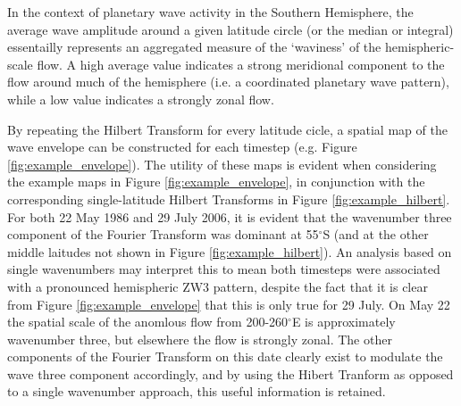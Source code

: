 In the context of planetary wave activity in the Southern Hemisphere, the average wave amplitude around a given latitude circle (or the median or integral) essentailly represents an aggregated measure of the `waviness' of the hemispheric-scale flow. A high average value indicates a strong meridional component to the flow around much of the hemisphere (i.e. a coordinated planetary wave pattern), while a low value indicates a strongly zonal flow. 

By repeating the Hilbert Transform for every latitude cicle, a spatial map of the wave envelope can be constructed for each timestep (e.g. Figure \ref{fig:example_envelope}). The utility of these maps is evident when considering the example maps in Figure \ref{fig:example_envelope}, in conjunction with the corresponding single-latitude Hilbert Transforms in Figure \ref{fig:example_hilbert}. For both 22 May 1986 and 29 July 2006, it is evident that the wavenumber three component of the Fourier Transform was dominant at 55$^{\circ}$S (and at the other middle laitudes not shown in Figure \ref{fig:example_hilbert}). An analysis based on single wavenumbers may interpret this to mean both timesteps were associated with a pronounced hemispheric ZW3 pattern, despite the fact that it is clear from Figure \ref{fig:example_envelope} that this is only true for 29 July. On May 22 the spatial scale of the anomlous flow from 200-260$^{\circ}$E is approximately wavenumber three, but elsewhere the flow is strongly zonal. The other components of the Fourier Transform on this date clearly exist to modulate the wave three component accordingly, and by using the Hibert Tranform as opposed to a single wavenumber approach, this useful information is retained.
